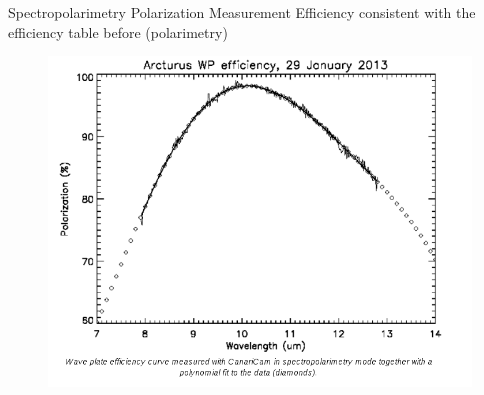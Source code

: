 \documentclass{beamer}
\begin{document}
\begin{frame}{Spectropolarimetry}
Polarization Measurement Efficiency consistent with the efficiency table before (polarimetry)
\begin{figure}[H]
 \centering
 \includegraphics[scale=0.35]{img12.png}
\end{figure}
\end{frame}
\end{document}
